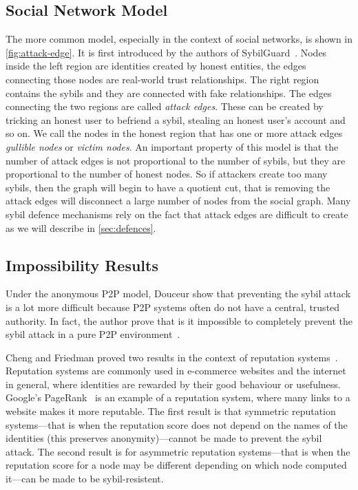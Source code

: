 \subsection{Social Network Model}
The more common model, especially in the context of social networks, is shown in
\autoref{fig:attack-edge}. It is first introduced by the authors of
SybilGuard~\cite{yu2006sybilguard}. Nodes inside the left region are identities
created by honest entities, the edges connecting those nodes are real-world
trust relationships. The right region contains the sybils and they are connected
with fake relationships. The edges connecting the two regions are called
\emph{attack edges}. These can be created by tricking an honest user to befriend
a sybil, stealing an honest user's account and so on. We call the nodes in the
honest region that has one or more attack edges \emph{gullible nodes} or
\emph{victim nodes}. An important property of this model is that the number of
attack edges is not proportional to the number of sybils, but they are
proportional to the number of honest nodes. So if attackers create too many
sybils, then the graph will begin to have a quotient cut, that is removing the
attack edges will disconnect a large number of nodes from the social graph. Many
sybil defence mechanisms rely on the fact that attack edges are difficult to
create as we will describe in \autoref{sec:defences}.

\subsection{Impossibility Results}\label{sec:sybil-theory}
Under the anonymous P2P model, Douceur show that preventing the sybil attack is
a lot more difficult because P2P systems often do not have a central, trusted
authority. In fact, the author prove that is it impossible to completely prevent
the sybil attack in a pure P2P environment~\cite{douceur2002sybil}.

Cheng and Friedman proved two results in the context of reputation
systems~\cite{cheng2005sybilproof}. Reputation systems are commonly used in
e-commerce websites and the internet in general, where identities are rewarded
by their good behaviour or usefulness. Google's PageRank~\cite{page1999pagerank}
is an example of a reputation system, where many links to a website makes it
more reputable. The first result is that symmetric reputation systems---that is
when the reputation score does not depend on the names of the identities (this
preserves anonymity)---cannot be made to prevent the sybil attack. The second
result is for asymmetric reputation systems---that is when the reputation score
for a node may be different depending on which node computed it---can be made to
be sybil-resistent.

